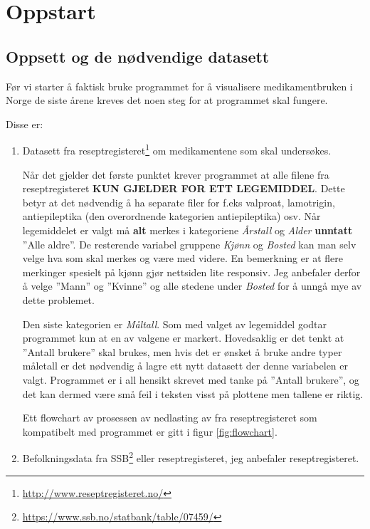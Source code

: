 \documentclass[12pt,norsk,a4paper,fleqn]{article}
\numberwithin{equation}{section}
\begin{document}
\newpage


\section{Oppstart} \label{sec:02}

\subsection*{Oppsett og de nødvendige datasett}

Før vi starter å faktisk bruke programmet for å visualisere medikamentbruken i Norge de siste årene kreves det noen steg for at programmet skal fungere.

Disse er:
\begin{enumerate}
\item Datasett fra reseptregisteret\footnote{\url{http://www.reseptregisteret.no/}} om medikamentene som skal undersøkes.

Når det gjelder det første punktet krever programmet at alle filene fra reseptregisteret \textbf{KUN GJELDER FOR ETT LEGEMIDDEL}. Dette betyr at det nødvendig å ha separate filer for f.eks valproat, lamotrigin, antiepileptika (den overordnende kategorien antiepileptika) osv. Når legemiddelet er valgt må \textbf{alt} merkes i kategoriene \textit{Årstall} og \textit{Alder} \textbf{unntatt} ''Alle aldre''. De resterende variabel gruppene \textit{Kjønn} og \textit{Bosted} kan man selv velge hva som skal merkes og være med videre. En bemerkning er at flere merkinger spesielt på kjønn gjør nettsiden lite responsiv. Jeg anbefaler derfor å velge ''Mann'' og ''Kvinne'' og alle stedene under \textit{Bosted} for å unngå mye av dette problemet.

Den siste kategorien er \textit{Måltall}. Som med valget av legemiddel godtar programmet kun at en av valgene er markert. Hovedsaklig er det tenkt at ''Antall brukere'' skal brukes, men hvis det er ønsket å bruke andre typer måletall er det nødvendig å lagre ett nytt datasett der denne variabelen er valgt. Programmet er i all hensikt skrevet med tanke på ''Antall brukere'', og det kan dermed være små feil i teksten visst på plottene men tallene er riktig.

Ett flowchart av prosessen av nedlasting av fra reseptregisteret som kompatibelt med programmet er gitt i figur \ref{fig:flowchart}.

\item Befolkningsdata fra SSB\footnote{\url{https://www.ssb.no/statbank/table/07459/}} eller reseptregisteret, jeg anbefaler reseptregisteret.


\end{enumerate}
\end{document}
